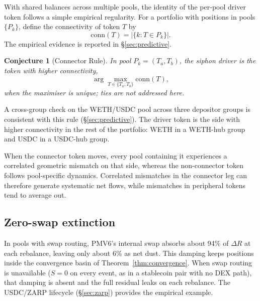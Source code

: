 \documentclass[11pt,a4paper]{article}
\theoremstyle{plain}
\newtheorem{conjecture}{Conjecture}
\begin{document}
With shared balances across multiple pools, the identity of the per-pool driver token follows a simple empirical regularity. For a portfolio with positions in pools $\{P_k\}$, define the connectivity of token $T$ by
\[
\mathrm{conn}(T) = \bigl|\{k : T \in P_k\}\bigr|.
\]
The empirical evidence is reported in \S\ref{sec:predictive}.

\begin{conjecture}[Connector Rule]
In pool $P_k = (T_a, T_b)$, the siphon driver is the token with higher connectivity,
\[
\arg\max_{T \in \{T_a, T_b\}} \mathrm{conn}(T),
\]
when the maximiser is unique; ties are not addressed here.
\end{conjecture}

A cross-group check on the WETH/USDC pool across three depositor groups is consistent with this rule (\S\ref{sec:predictive}). The driver token is the side with higher connectivity in the rest of the portfolio: WETH in a WETH-hub group and USDC in a USDC-hub group.

When the connector token moves, every pool containing it experiences a correlated geometric mismatch on that side, whereas the non-connector token follows pool-specific dynamics. Correlated mismatches in the connector leg can therefore generate systematic net flows, while mismatches in peripheral tokens tend to average out.

\subsection{Zero-swap extinction}\label{sec:extinction}

In pools with swap routing, PMV6's internal swap absorbs about 94\% of $\Delta R$ at each rebalance, leaving only about 6\% as net dust. This damping keeps positions inside the convergence basin of Theorem~\ref{thm:convergence}. When swap routing is unavailable ($S = 0$ on every event, as in a stablecoin pair with no DEX path), that damping is absent and the full residual leaks on each rebalance. The USDC/ZARP lifecycle (\S\ref{sec:zarp}) provides the empirical example.
\end{document}
